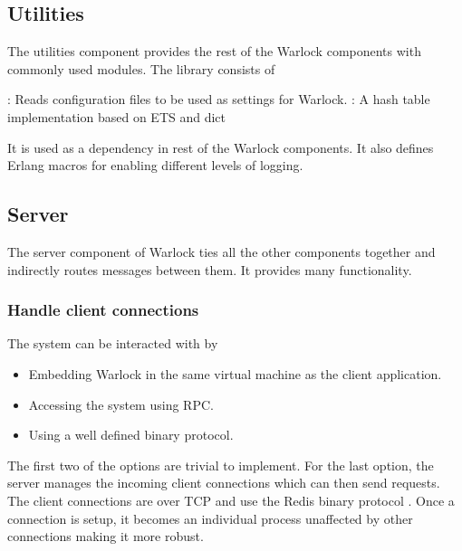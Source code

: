 \subsection{Utilities}

The utilities component provides the rest of the Warlock components with
commonly used modules. The library consists of

\begin{itemize}
    : Reads configuration files to be used as
    settings for Warlock.
    : A hash table implementation based on ETS%
    and dict%
\end{itemize}

It is used as a dependency in rest of the Warlock components. It also defines
Erlang macros%
for enabling different levels of logging.

\subsection{Server}

The server component of Warlock ties all the other components together and
indirectly routes messages between them. It provides many functionality.

\subsubsection{Handle client connections}
\label{section:a.n.d.client.conn}

The system can be interacted with by

\begin{itemize}
  \item Embedding Warlock in the same virtual machine as the
    client application.
  \item Accessing the system using RPC.
  \item Using a well defined binary protocol.
\end{itemize}

The first two of the options are trivial to implement. For the last option, the
server manages the incoming client connections which can then send requests. The
client connections are over TCP and use the Redis binary protocol
\citep{RedisProtocol}%
. Once a connection is setup, it becomes an individual process unaffected by
other connections making it more robust.

